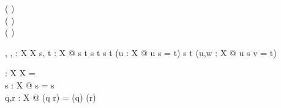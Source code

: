 
\begin{zed}
  \relation ( \varg \prefix \varg )\\
  \relation ( \varg \suffix \varg )\\
  \relation ( \varg \infix \varg )
\end{zed}

\begin{gendef}[X]
  \varg \prefix \varg ,  \varg \suffix \varg , \varg \infix \varg : \seq X \rel \seq X
\where
  \forall s, t : \seq X @
     s \prefix t \iff s \subseteq t \land
     s \suffix t \iff (\exists u : \seq X @ u \cat s = t) \land
     s \infix t \iff (\exists u,w : \seq X @ u \cat s \cat v = t)
\end{gendef}

\begin{gendef}[X]
  \dcat : \seq \seq X \fun \seq X
\where
  \dcat \langle \rangle = \langle \rangle\\
  \forall s : \seq X @ \dcat \langle s \rangle = s\\
  \forall q,r : \seq \seq X @ \dcat(q \cat r) = (\dcat q) \cat (\dcat r)
\end{gendef}
